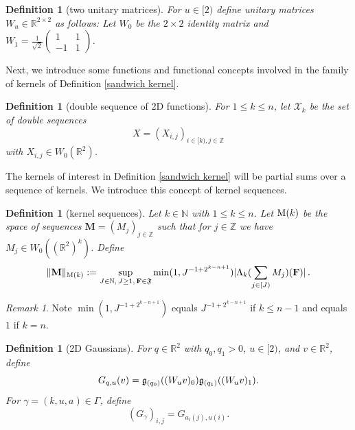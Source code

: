 \documentclass[12pt,reqno]{amsart}
\theoremstyle{plain}
\newtheorem{definition}[theorem]{Definition}
\numberwithin{equation}{section}
\theoremstyle{remark}
\newtheorem{rem}{Remark}[section]
\newcommand{\uses}[1]{}
\newcommand{\usesdefs}[1]{}
\newcommand{\Z}{{\mathbb Z}}
\newcommand{\R}{{\mathbb R}}
\newcommand{\N}{{\mathbb N}}
\newcommand{\M}{\mathbf{M}}
\newcommand{\F}{\mathbf{F}}
\begin{document}
\begin{definition}[two unitary matrices]\label{auto:unitary-matrices-definition}\uses{}\usesdefs{}
For $u\in [2)$ define unitary matrices $W_u\in\R^{2\times 2}$ as follows:
Let $W_0$ be the $2\times 2$ identity matrix and $W_1=\frac{1}{\sqrt{2}}\begin{pmatrix}1 & 1\\-1 & 1\end{pmatrix}$.
\end{definition}


Next, we introduce some functions and functional concepts involved in the family of kernels of Definition \ref{sandwich kernel}.


\begin{definition}[double sequence of 2D functions]\label{double sequence of 2D functions}\uses{}\usesdefs{auto:Wiener-space-definition}
  For $1\le k\le n$, let $\mathcal{X}_k$ be the set of
  double sequences
  \begin{equation}\label{auto:sandwich-data-array}
      X=(X_{i,j})_{i\in [k),j\in \Z}
  \end{equation}
  with $X_{i,j}\in W_0(\R^2)$.
\end{definition}


The kernels of interest in Definition \ref{sandwich kernel} will be partial sums over a sequence of kernels.
We introduce this concept of kernel sequences.

\begin{definition}[kernel sequences]\label{kernel sequences}\uses{}\usesdefs{auto:Wiener-space-definition,normalized function tuples,auto:prism-form-definition}
Let $k\in\N$ with $1\le k\le n$. Let ${\rm M}(k)$ be the space of sequences $\M=(M_j)_{j\in \Z}$ such that for $j\in \Z$ we have
$M_j\in W_0((\R^2)^k)$. Define
\begin{equation}\label{auto:M-k-norm-definition}
\|\M\|_{{\rm M}(k)}:=\sup_{J\in\N,\,J\ge1,\,\F\in\mathfrak F}\min(1,J^{-1+2^{k-n+1}}) |\Lambda_k(\sum_{j\in [J)} M_j)(\F)| \, .
\end{equation}
\end{definition}

\begin{rem}
Note $\min(1,J^{-1+2^{k-n+1}})$ equals $J^{-1+2^{k-n+1}}$ if $k\le n-1$ and equals $1$ if $k=n$.
\end{rem}


\begin{definition}[2D Gaussians]\label{2D Gaussians}\uses{}\usesdefs{gaussian,geometric parameters,auto:unitary-matrices-definition}
For $q\in\R^2$ with $q_0,q_1>0$, $u\in[2)$, and $v\in\mathbb R^2$, define
\begin{equation}\label{auto:rotated-Gaussian-kernel} G_{q,u}(v) = \mathfrak{g}_{(q_0)}((W_u v)_0) \mathfrak{g}_{(q_1)}((W_u v)_1). \end{equation}
For $\gamma=(k,u,a)\in \Gamma$, define
\begin{equation}\label{auto:sandwich-Gaussian-factor} (G_{\gamma})_{i,j} = G_{a_i(j),u(i)}. \end{equation}
\end{definition}
\end{document}
